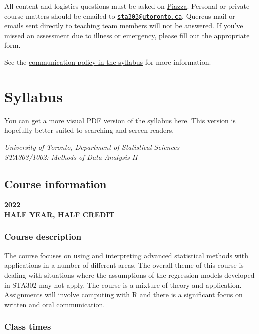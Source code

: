 \documentclass[
  openany]{book}
\begin{document}
All content and logistics questions must be asked on \href{https://piazza.com/class/kx47tj4fmy65dg}{Piazza}. Personal or private course matters should be emailed to \href{mailto:sta303@utoronto.ca}{\nolinkurl{sta303@utoronto.ca}}. Quercus mail or emails sent directly to teaching team members will not be answered. If you've missed an assessment due to illness or emergency, please fill out the appropriate form.

See the \protect\hyperlink{communication-policy}{communication policy in the syllabus} for more information.

\hypertarget{syllabus}{%
\chapter{Syllabus}\label{syllabus}}

You can get a more visual PDF version of the syllabus \href{https://sta303-bolton.github.io/sta303-w22-courseguide/other-files/STA303-1002_W22_syllabus.pdf}{here}. This version is hopefully better suited to searching and screen readers.

\emph{University of Toronto, Department of Statistical Sciences}\\
\emph{STA303/1002: Methods of Data Analysis II}

\hypertarget{course-information}{%
\section{Course information}\label{course-information}}

\textbf{2022}\\
\textbf{HALF YEAR, HALF CREDIT}

\hypertarget{course-description}{%
\subsection{Course description}\label{course-description}}

The course focuses on using and interpreting advanced statistical methods with applications in a number of different areas. The overall theme of this course is dealing with situations where the assumptions of the regression models developed in STA302 may not apply. The course is a mixture of theory and application. Assignments will involve computing with R and there is a significant focus on written and oral communication.

\hypertarget{class-times}{%
\subsection{Class times}\label{class-times}}
\end{document}
